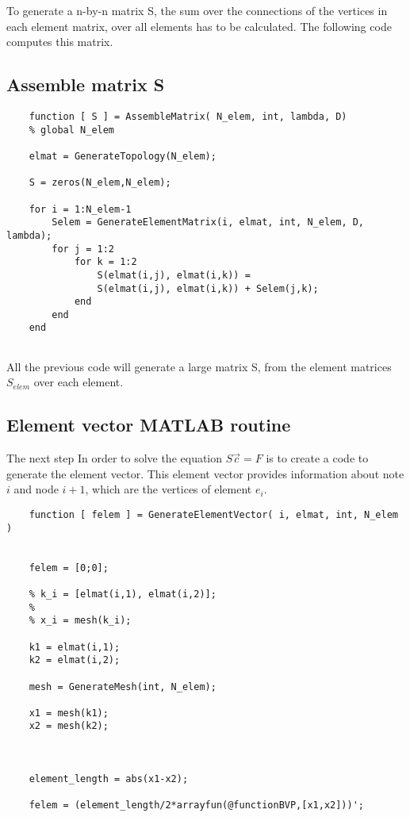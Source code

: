 \documentclass{report}
\begin{document}
\bigskip

To generate a n-by-n matrix S, the sum over the connections of the vertices in each element matrix, over all elements has to be calculated. The following code computes this matrix.


\subsection{Assemble matrix S}

\begin{lstlisting}
	function [ S ] = AssembleMatrix( N_elem, int, lambda, D)
	% global N_elem 
	
	elmat = GenerateTopology(N_elem);
	
	S = zeros(N_elem,N_elem);
	
	for i = 1:N_elem-1
		Selem = GenerateElementMatrix(i, elmat, int, N_elem, D, lambda);
		for j = 1:2
			for k = 1:2
				S(elmat(i,j), elmat(i,k)) =
				S(elmat(i,j), elmat(i,k)) +	Selem(j,k);
			end
		end
	end


\end{lstlisting}



All the previous code will generate a large matrix S, from the element matrices $S_{elem}$ over each element.\\



\subsection{Element vector MATLAB routine}

The next step In order to solve the equation $S\vec{c}=F$ is to create a code to generate the element vector. This element vector provides information about note $i$ and node $i+1$, which are the vertices of element $e_i$.\\



\begin{lstlisting}
	function [ felem ] = GenerateElementVector( i, elmat, int, N_elem )
	
	
	felem = [0;0];
	
	% k_i = [elmat(i,1), elmat(i,2)];
	% 
	% x_i = mesh(k_i);
	
	k1 = elmat(i,1);
	k2 = elmat(i,2);
	
	mesh = GenerateMesh(int, N_elem);
	
	x1 = mesh(k1);
	x2 = mesh(k2);
	
	
	
	element_length = abs(x1-x2);
	
	felem = (element_length/2*arrayfun(@functionBVP,[x1,x2]))';
	

\end{lstlisting}
\end{document}
